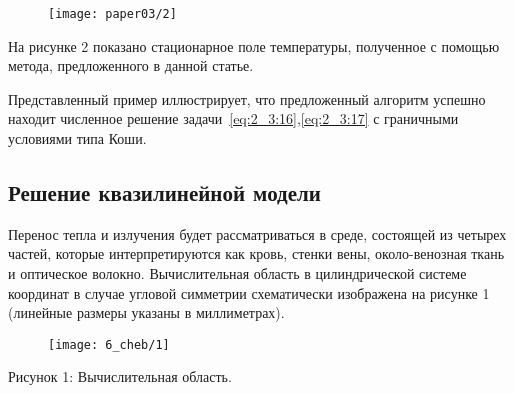 \begin{figure}[h]
    \label{fig:2_3:2}
    \texttt{[image: paper03/2]}
    \caption{}
\end{figure}
На рисунке 2 показано стационарное поле температуры,
полученное с помощью метода, предложенного в данной статье.

Представленный пример иллюстрирует, что предложенный
алгоритм успешно находит численное решение
задачи~\eqref{eq:2_3:16},\eqref{eq:2_3:17} с граничными
условиями типа Коши.



\subsection{Решение квазилинейной модели}
\label{subsec:ch4/sec3/quasilinear}
Перенос тепла и излучения будет рассматриваться в среде,
состоящей из четырех частей, которые интерпретируются как кровь,
стенки вены, около-венозная ткань и оптическое волокно.
Вычислительная область в цилиндрической системе координат в случае
угловой симметрии схематически изображена на рисунке 1
(линейные размеры указаны в миллиметрах).

\begin{figure}[h!]
    \label{fig:4_3:123}
    \centering
    { \texttt{[image: 6\_cheb/1]} }
    \caption{}
\end{figure}
Рисунок 1: Вычислительная область.

